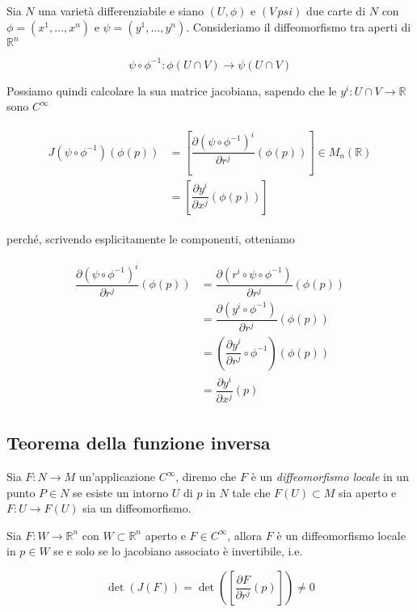 Sia $ N $ una varietà differenziabile e siano $ (U,\phi) $ e $ (V\,psi) $ due carte di $ N $ con $ \phi = (x^{1},\dots,x^{n}) $ e $ \psi = (y^{1},\dots,y^{n}) $. Consideriamo il diffeomorfismo tra aperti di $ \mathbb{R}^{n} $

\begin{equation}
	\psi \circ \phi^{-1} : \phi(U \cap V) \to \psi(U \cap V)
\end{equation}

Possiamo quindi calcolare la sua matrice jacobiana, sapendo che le $ y^{i} : U \cap V \to \mathbb{R} $ sono $ C^{\infty} $

\begin{align}
	\begin{split}
		J(\psi \circ \phi^{-1})(\phi(p)) &= \left[ \dfrac{\partial (\psi \circ \phi^{-1})^{i}}{\partial r^{j}} (\phi(p)) \right] \in M_{n}(\mathbb{R})\\
		&= \left[ \dfrac{\partial y^{i}}{\partial x^{j}} (\phi(p)) \right]
	\end{split}
\end{align}

perché, scrivendo esplicitamente le componenti, otteniamo

\begin{align}
	\begin{split}
		\dfrac{\partial (\psi \circ \phi^{-1})^{i}}{\partial r^{j}} (\phi(p)) &= \dfrac{\partial (r^{i} \circ \psi \circ \phi^{-1})}{\partial r^{j}} (\phi(p))\\
		&= \dfrac{\partial (y^{i} \circ \phi^{-1})}{\partial r^{j}} (\phi(p))\\
		&= \left( \dfrac{\partial y^{i}}{\partial r^{j}} \circ \phi^{-1} \right) (\phi(p))\\
		&= \dfrac{\partial y^{i}}{\partial x^{j}} (p)
	\end{split}
\end{align}

\subsection{Teorema della funzione inversa}

Sia $ F : N \to M $ un'applicazione $ C^{\infty} $, diremo che $ F $ è un \textit{diffeomorfismo locale} in un punto $ P \in N $ se esiste un intorno $ U $ di $ p $ in $ N $ tale che $ F(U) \subset M $ sia aperto e $ F : U \to F(U) $ sia un diffeomorfismo.

\begin{theorem}
	Sia $ F : W \to \mathbb{R}^{n} $ con $ W \subset \mathbb{R}^{n} $ aperto e $ F \in C^{\infty} $, allora $ F $ è un diffeomorfismo locale in $ p \in W $ se e solo se lo jacobiano associato è invertibile, i.e.
	
	\begin{equation}
		\det(J(F)) = \det( \left[ \dfrac{\partial F}{\partial r^{j}} (p) \right] ) \neq 0
	\end{equation}
\end{theorem}

